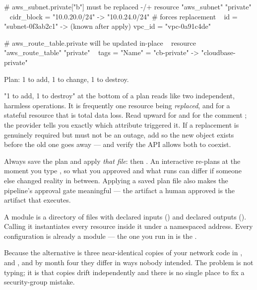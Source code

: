 \begin{planbox}
  # aws_subnet.private["b"] must be replaced
-/+ resource "aws_subnet" "private" {
      ~ cidr_block = "10.0.20.0/24" -> "10.0.24.0/24" # forces replacement
      ~ id         = "subnet-0f3ab2c1" -> (known after apply)
        vpc_id     = "vpc-0a91c4de"
    }

  # aws_route_table.private will be updated in-place
~ resource "aws_route_table" "private" {
      ~ tags = { "Name" = "cb-private" -> "cloudbase-private" }
    }

Plan: 1 to add, 1 to change, 1 to destroy.
\end{planbox}

\begin{misconception}
"1 to add, 1 to destroy" at the bottom of a plan reads like two independent, harmless operations. It is frequently one resource being \emph{replaced}, and for a stateful resource that is total data loss. Read upward for \code{-/+} and for the comment ; the provider tells you exactly which attribute triggered it. If a replacement is genuinely required but must not be an outage, add  so the new object exists before the old one goes away --- and verify the API allows both to coexist.
\end{misconception}

\begin{prodtip}
Always save the plan and apply \emph{that file}:  then . An interactive  re-plans at the moment you type , so what you approved and what runs can differ if someone else changed reality in between. Applying a saved plan file also makes the pipeline's approval gate meaningful --- the artifact a human approved is the artifact that executes.
\end{prodtip}


 A module is a directory of  files with declared inputs () and declared outputs (). Calling it instantiates every resource inside it under a namespaced address. Every configuration is already a module --- the one you run in is the .

 Because the alternative is three near-identical copies of your network code in ,  and , and by month four they differ in ways nobody intended. The problem is not typing; it is that copies drift independently and there is no single place to fix a security-group mistake.


